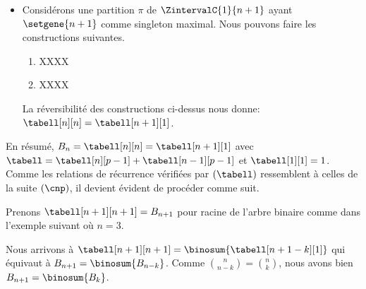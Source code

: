 \begin{itemize}
    \item Considérons une partition $\pi$ de $\ZintervalC{1}{n+1}$ ayant $\setgene{n+1}$ comme singleton maximal.
    Nous pouvons faire les constructions suivantes.
    \begin{enumerate}
        \item XXXX


        \item XXXX
    \end{enumerate}
    La réversibilité des constructions ci-dessus nous donne:
    $\tabell[n][n] = \tabell[n+1][1]$.
\end{itemize}


En résumé,
$B_n = \tabell[n][n] = \tabell[n+1][1]$
avec
$\tabell = \tabell[n][p-1] + \tabell[n-1][p-1]$
et
$\tabell[1][1] = 1$. 
%
Comme les relations de récurrence vérifiées par $(\tabell)$ ressemblent à celles de la suite $(\cnp)$,
il devient évident de procéder comme suit.

\explaintree{\tabell}{\tabell[n][p-1]}{\tabell[n-1][p-1]}%
            {\bellintertree}{}

Prenons $\tabell[n+1][n+1] = B_{n+1}$ pour racine de l'arbre binaire comme dans l'exemple suivant où $n = 3$.


Nous arrivons à
$\tabell[n+1][n+1] = \binosum{\tabell[n+1-k][1]}$
qui équivaut à
$B_{n+1} = \binosum{B_{n-k}}$.
Comme $\binom{n}{n-k} = \binom{n}{k}$, nous avons bien 
$B_{n+1} = \binosum{B_k}$.